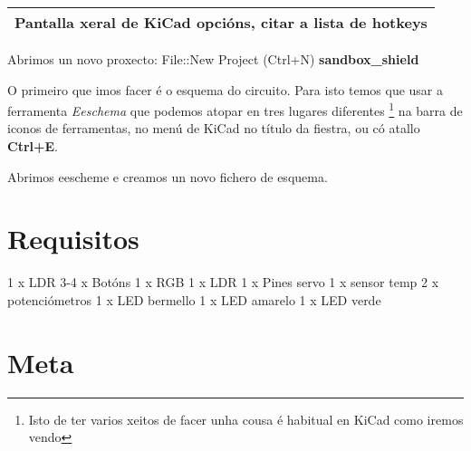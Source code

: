 \begin{longtable}[c]{@{}l@{}}
\toprule
Pantalla xeral de KiCad opcións, citar a lista de hotkeys\tabularnewline
\bottomrule
\end{longtable}

Abrimos un novo proxecto: File::New Project (Ctrl+N)
\textbf{sandbox\_shield}

O primeiro que imos facer é o esquema do circuito. Para isto temos que
usar a ferramenta \emph{Eeschema} que podemos atopar en tres lugares
diferentes \footnote{Isto de ter varios xeitos de facer unha cousa é
  habitual en KiCad como iremos vendo} na barra de iconos de
ferramentas, no menú de KiCad no título da fiestra, ou có atallo
\textbf{Ctrl+E}.

Abrimos eescheme e creamos un novo fichero de esquema.

\section{Requisitos}\label{requisitos}

1 x LDR 3-4 x Botóns 1 x RGB 1 x LDR 1 x Pines servo 1 x sensor temp 2 x
potenciómetros 1 x LED bermello 1 x LED amarelo 1 x LED verde

\section{Meta}\label{meta}
